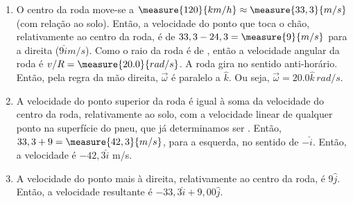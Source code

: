 \begin{question}
    \begin{solution}
      \begin{enumerate}
        \item O centro da roda move-se a $\measure{120}{km/h} \approx \measure{33,3}{m/s}$ (com relação ao solo).
        Então, a velocidade do ponto que toca o chão, relativamente ao centro da roda, é de $33,3 - 24,3 = \measure{9}{m/s}$ para a direita ($9\hat i\unit{m/s}$).
        Como o raio da roda é de , então a velocidade angular da roda é $v/R = \measure{20.0}{rad/s}$.
        A roda gira no sentido anti-horário.
        Então, pela regra da mão direita, $\vec \omega$ é paralelo a $\hat k$.
        Ou seja, $\vec \omega = 20.0\hat k\,\unit{rad/s}$.
        \item A velocidade do ponto superior da roda é igual à soma da velocidade do centro da roda, relativamente ao solo, com a velocidade linear de qualquer ponto na superfície do pneu, que já determinamos ser .
        Então, $33,3 + 9 = \measure{42,3}{m/s}$, para a esquerda, no sentido de $-\hat i$.
        Então, a velocidade é $-42,3\hat i$ \unit{m/s}.
        \item A velocidade do ponto mais à direita, relativamente ao centro da roda, é $9\hat j$.
        Então, a velocidade resultante é $-33,3\hat i + 9,00\hat j$.
      \end{enumerate}
    \end{solution}
\end{question}